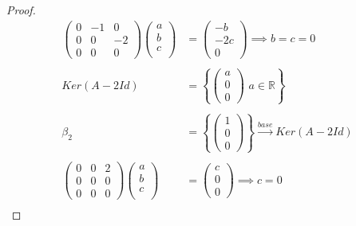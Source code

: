 \documentclass[11pt]{article}
\newcommand{\R}{\mathbb{R}}
\begin{document}
\begin{proof}
    \begin{align*}
        \begin{pmatrix}
            0&-1&0\\
            0&0&-2\\
            0&0&0
        \end{pmatrix}
        \begin{pmatrix}
            a\\
            b\\
            c\\
        \end{pmatrix}&=\begin{pmatrix}
            -b\\
            -2c\\
            0
        \end{pmatrix}\implies
        b=c=0\,\\
        \,\\
        Ker(A-2Id)&=\left\{\begin{pmatrix}
            a\\
            0\\
            0
        \end{pmatrix}\,\,a\in \R\right\}\,\\
        \,\\
        \beta_2&=\left\{\begin{pmatrix}
        1\\
        0\\
        0
        \end{pmatrix}\right\}\xrightarrow{base}Ker(A-2Id)\\
        \,\\
          \begin{pmatrix}
            0&0&2\\
            0&0&0\\
            0&0&0
        \end{pmatrix}
        \begin{pmatrix}
            a\\
            b\\
            c\\
        \end{pmatrix}&=\begin{pmatrix}
            c\\
            0\\
            0
        \end{pmatrix}\implies
        c=0\,\\

\end{align*}
\end{proof}
\end{document}
